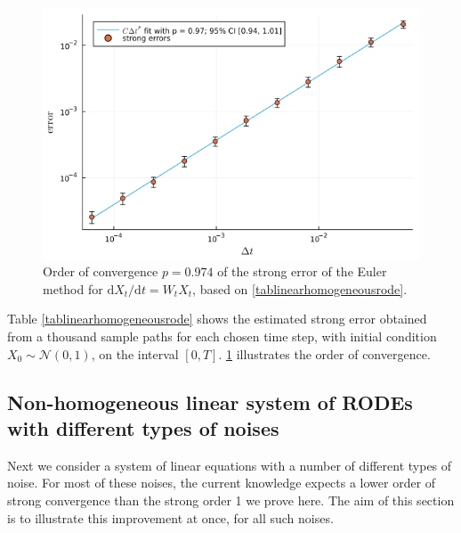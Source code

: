 \documentclass[reqno,12pt]{amsart}
\theoremstyle{plain} %
\theoremstyle{definition} %
\begin{document}
\begin{figure}[htb]
    \includegraphics[scale=0.6]{img/order_wiener_linearhomogenous.png}
    \caption{Order of convergence $p = 0.974$ of the strong error of the Euler method for $\mathrm{d}X_t/\mathrm{d}t = W_t X_t$, based on \cref{tablinearhomogeneousrode}.}
    \label{figlinearhomogeneousrode}
\end{figure}

Table \ref{tablinearhomogeneousrode} shows the estimated strong error obtained from a thousand sample paths for each chosen time step, with initial condition $X_0 \sim \mathcal{N}(0, 1)$, on the interval $[0, T]$. \cref{figlinearhomogeneousrode} illustrates the order of convergence.

\subsection{Non-homogeneous linear system of RODEs with different types of noises}

Next we consider a system of linear equations with a number of different types of noise. For most of these noises, the current knowledge expects a lower order of strong convergence than the strong order 1 we prove here. The aim of this section is to illustrate this improvement at once, for all such noises.
\end{document}
